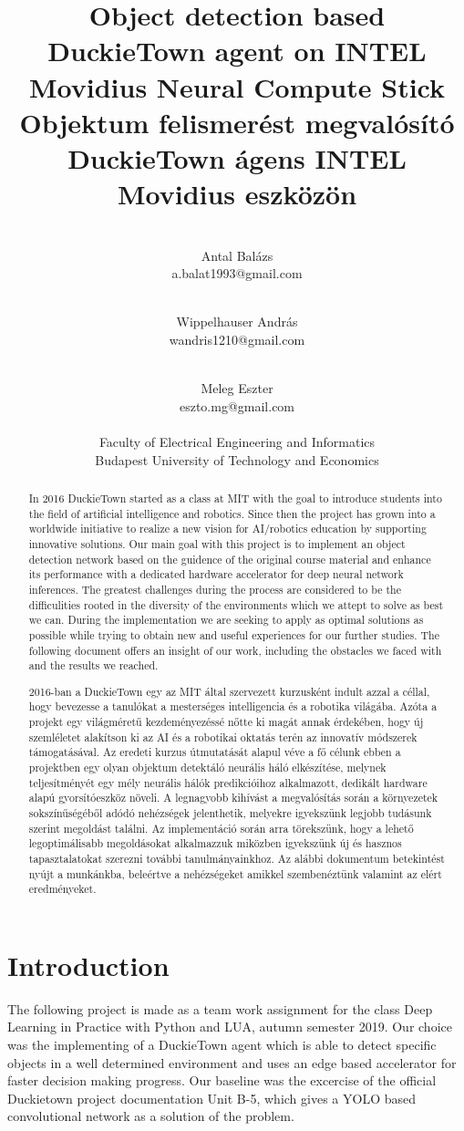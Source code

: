 \documentclass{article}
\title{Object detection based DuckieTown agent on INTEL Movidius Neural Compute Stick \\
	\large Objektum felismerést megvalósító DuckieTown ágens INTEL Movidius eszközön}
\author{ \\
Antal Balázs\\ a.balat1993@gmail.com
\and \\
Wippelhauser András\\ wandris1210@gmail.com
\and \\
Meleg Eszter\\ eszto.mg@gmail.com\\
\\
Faculty of Electrical Engineering and Informatics\\
Budapest University of Technology and Economics\\
}
\begin{document}
\maketitle

\begin{abstract}
In 2016 DuckieTown started as a class at MIT with the goal to introduce students into the field of artificial intelligence and robotics. Since then the project has grown into a worldwide initiative to realize a new vision for AI/robotics education by supporting innovative solutions. Our main goal with this project is to implement an object detection network based on the guidence of the original course material and enhance its performance with a dedicated hardware accelerator for deep neural network inferences. The greatest challenges during the process are considered to be the difficulities rooted in the diversity of the environments which we attept to solve as best we can. During the implementation we are seeking to apply as optimal solutions as possible while trying to obtain new and useful experiences for our further studies. The following document offers an insight of our work, including the obstacles we faced with and the results we reached.
\end{abstract}

\begin{abstract}

2016-ban a DuckieTown egy az MIT által szervezett kurzusként indult azzal a céllal, hogy bevezesse a tanulókat a mesterséges intelligencia és a robotika világába. Azóta a projekt egy világméretű kezdeményezéssé nőtte ki magát annak érdekében, hogy új szemléletet alakítson ki az AI és a robotikai oktatás terén az innovatív módszerek támogatásával. Az eredeti kurzus útmutatását alapul véve a fő célunk ebben a projektben egy olyan objektum detektáló neurális háló elkészítése, melynek teljesítményét egy mély neurális hálók predikcióihoz alkalmazott, dedikált hardware alapú gyorsítóeszköz növeli. A legnagyobb kihívást a megvalósítás során a környezetek sokszínűségéből adódó nehézségek jelenthetik, melyekre igyekszünk legjobb tudásunk szerint megoldást találni. Az implementáció során arra törekszünk, hogy a lehető legoptimálisabb megoldásokat alkalmazzuk miközben igyekszünk új és hasznos tapasztalatokat szerezni további tanulmányainkhoz. Az alábbi dokumentum  betekintést nyújt a munkánkba, beleértve a nehézségeket amikkel szembenéztünk valamint az elért eredményeket.
\end{abstract}

\section{Introduction}
The following project is made as a team work assignment for the class Deep Learning in Practice with Python and LUA, autumn semester 2019. Our choice was the implementing of a DuckieTown agent which is able to detect specific objects in a well determined environment and uses an edge based accelerator for faster decision making progress. Our baseline was the excercise of the official Duckietown project documentation Unit B-5, which gives a YOLO based convolutional network as a solution of the problem.
\end{document}
